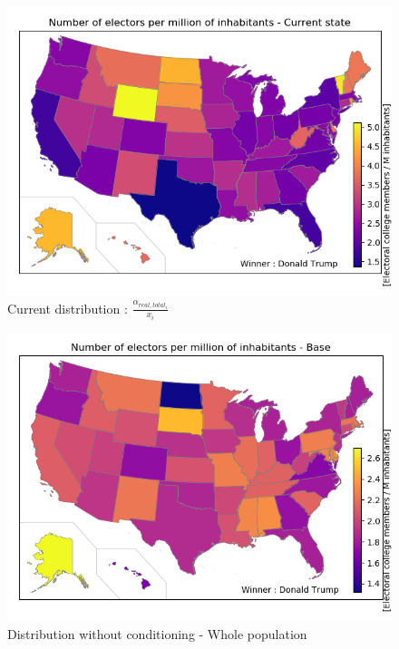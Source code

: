 \documentclass[a4paper,9pt,calibri,oneside,openany, twocolumn]{report}
\theoremstyle{break}
\begin{document}
\begin{figure}[H]
	\vspace*{1.8cm}
	\centering
	\includegraphics[width=\linewidth]{mapCurrentTotal}
	\caption{Current distribution : $\frac{\alpha_{real,total_i}}{x_i}$}
\end{figure}
\begin{figure}[H]
	\vspace*{0.3cm}

	\centering
	\includegraphics[width=\linewidth]{mapTotalBase}
	\caption{Distribution without conditioning - Whole population}
\end{figure}
\end{document}

